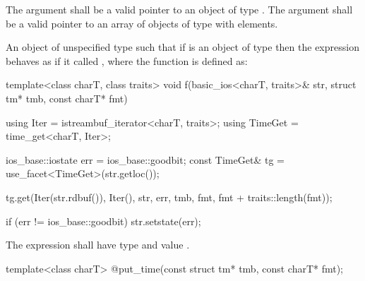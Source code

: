 \begin{itemdescr}
\pnum
\requires The argument  shall be a valid pointer to an object of type .
The argument  shall be a valid pointer to an array of objects of type  with  elements.

\pnum
\returns An object of unspecified type such that if  is an object of type
 then the expression  behaves as if it called , where the function  is
defined as:

\begin{codeblock}
template<class charT, class traits>
void f(basic_ios<charT, traits>& str, struct tm* tmb, const charT* fmt) {
  using Iter    = istreambuf_iterator<charT, traits>;
  using TimeGet = time_get<charT, Iter>;

  ios_base::iostate err = ios_base::goodbit;
  const TimeGet& tg = use_facet<TimeGet>(str.getloc());

  tg.get(Iter(str.rdbuf()), Iter(), str, err, tmb,
    fmt, fmt + traits::length(fmt));

  if (err != ios_base::goodbit)
    str.setstate(err);
}
\end{codeblock}

The expression  shall have type
 and value .
\end{itemdescr}

%
\begin{itemdecl}
template<class charT> @\unspec@ put_time(const struct tm* tmb, const charT* fmt);
\end{itemdecl}

